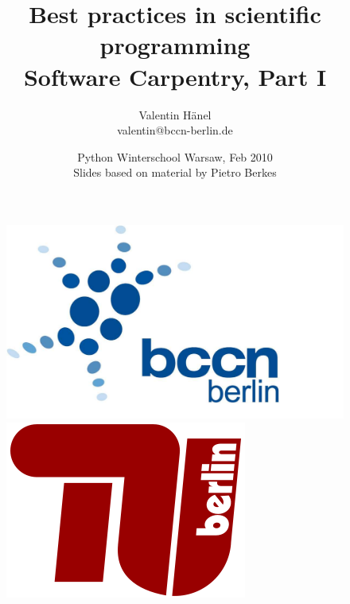 \documentclass[ hyperref={colorlinks=true,filecolor=blue,linkcolor=blue,urlcolor=blue}]{beamer}
\author{Valentin H\"anel\\
        valentin@bccn-berlin.de}
\institute{Technische Universität Berlin \\
Bernstein Center for Computational Neuroscience Berlin}
\title{Best practices in scientific programming\\
Software Carpentry, Part I}
\date{Python Winterschool Warsaw, Feb 2010\\
Slides based on material by Pietro Berkes}
\begin{document}
\begin{frame}
	\titlepage
    \begin{figure}
	    \includegraphics[scale=0.05]{BCCN_logo_berlin.pdf}
	    \includegraphics[scale=0.14]{tu_logo.png}
    \end{figure}
\end{frame}


\end{document}
